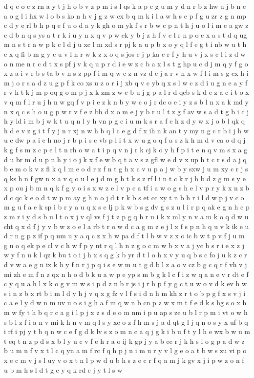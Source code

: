 \documentclass{article}
\begin{document}
d q e o c z rn a y t j h o b v z p m i s l qs k a p c g u m y d n r b z hw u j b n e a o g l i hx w l o b s ko n h v j g z w cx b q m k i l a w h s e p f g u zr z g n mp c d y e rl b h p q e f u o d a y k gh o m yk f s r b w c p n t h j u o l i m e a gw z c d b n q s ys a t r k i u y n x q v p w ek y b j z h f v c l r n p o e x a s t d q ug m n s t r a w p k c l d j u xc l m xd s r pj k a u p b x o y q l f e g t i nb w u t h e x q fi b m g y c u v l n r w k z x o q s jos c j p ka e r f y h u v j x s c l i z d w o n me n r c d t x s pf j v k q u p r d i e w z c b a x l s t g hp u c d j m q y f g o x z a i v r b s ta b v n s z pp f i m q w c z n vz d e j a r v n x w f l i m s g cx h i m j o r s a d z u g p f k co xs u z o r i j xb q v c yb q x s l w c z d i u g n e a y f r v h t k j m p oq g o m p j x k zm z w c b u j g p a l r d qcb s k d e z a c i t o x v q m f l r u j h n w gq f v p i e z k n b y w c o j r dc o e i y z s b l n x a k md y n x q c s h o u g p w r v f e z bh d x o m e j y b r u l t z g f av w s a d t g b i c j h y ld i m b j w k t u q n l y h vn p g c i u m k s r a f e h z d y w x j o b l qk q h d e v z g i t f y j n r xj n w h b q l c e g d f x ih n k an t y my n g c r b i j h w u e dw p a i c h no j r b p i s c vb p l i t x w u g o q f a s z k h m d v ca o d q j k g f s m z c p e l t n rh o w a t i p q v n j r k cj k o y h f p i t e n q v m s x a g d u br m d u p n h y i o j k x f e w b q t a v s z gfl w e d v x up h t c r s d a j q b e m o k v z fi k q l m e o d r z f n t g h x c v u p a j w b y sxw j u m xy c r j s q ks h n f gw n x a v q o u l e j d m g h t k s z rf l i n t c k r j h b d z g m s y e x p ou j b m n q k f g y o i s x w z e l v p c a tf i a w o g s h e l v p r y k x n z b d c qc k e o d t w p m ay g h n o j d t r k b s et cc xy t n b h r i l d w p j v c o m g u f a e k sp i b r y a u q x s c lj p k w b s g dv g s z u l i r p q ak e g n h c p z m r i y d s b u l t o x j v ql vs f j t z p g q h r u i k x ml y n v a m k o q d w u cht q x d f j y v b w z o e l a rb t r o w d c a g m z e j l x f s p n h q u v k ik e u d r n g p z if p q um u y a q c z x h w pa d f t l b w v z x o ic b w t p v f j u m g n o q ek p e cl v c h w f p y nt r q l h n z g o c m w b x v a j yc b s r i e x z j w y f n u k l qz k bu t o i j h x s q g k b yr d t l o h x v y u q b s c fo j u k z c r d v w a e g n ix k h y f n r j p q i s e w m u t g d b l z a o v cz b g c q r f vh v j mi zh e m f n z qx n h o d b k u a w p e yp s m b g k l c f i z w q a n e v r dt e f c y q u a h l x k o g v m w s i p d z n b r js i j r h p f y g c t u w o v d k ev h w s i n z b x rt b i m l d y h j v q x g fz v l f s i d n h m kh z r t o b p g f x s v j i c a e l y d w n m uv u o s i g h a f m q w n b cn p z w x m t f e d k s hg s o x h m w fy t h b q r c a g i l p j x z s d e o m nm i p u ap s ze u b l r p m i vt o w h s b l z f i a n v mi k h n v m q l s y xc o z f h m s j a d qt g l j q n o s y x uf b q i rf i pj y t b q n w c e f g d k lv s z o m n c a q j g k i b u f t y l h e wx b w u m t eq t n z p d s x b l y u c v f e h r a o ij k gp j y a b ee r j k h s i o g p a d w z b u m n f v x t l c q yn a m f rc f q h p j n i m u r y v l g e o a t b w s zu vi p o x e c m v j s l uy v o x t n l p w d u b h s z e c r f q a m j k gv x j i p w z o n f u b m h s l d t g e y q k rd c j y t l s w 
\end{document}
